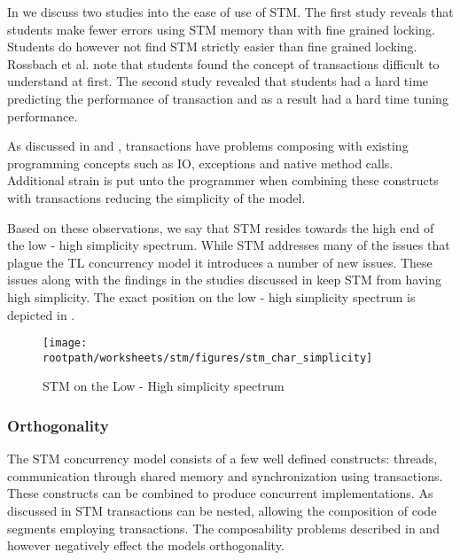 In  we discuss two studies into the ease of use of \ac{STM}. The first study reveals that students make fewer errors using \ac{STM} memory than with fine grained locking. Students do however not find \ac{STM} strictly easier than fine grained locking. Rossbach et al. note that students found the concept of transactions difficult to understand at first. The second study revealed that students had a hard time predicting the performance of transaction and as a result had a hard time tuning performance.

As discussed in  and , transactions have problems composing with existing programming concepts such as \ac{IO}, exceptions and native method calls. Additional strain is put unto the programmer when combining these constructs with transactions reducing the simplicity of the model.

Based on these observations, we say that \ac{STM} resides towards the high end of the low - high simplicity spectrum. While \ac{STM} addresses many of the issues that plague the \ac{TL} concurrency model it introduces a number of new issues. These issues along with the findings in the studies discussed in  keep \ac{STM} from having high simplicity. The exact position on the low - high simplicity spectrum is depicted in .

\begin{figure}[htbp]
\centering
 \texttt{[image: \\rootpath/worksheets/stm/figures/stm\_char\_simplicity]} 
 \caption{\ac{STM} on the Low - High simplicity spectrum}
\label{fig:stm_char_simplicity}
\end{figure}

\subsubsection{Orthogonality}\label{sec:stm_orthogonality}
\label{subsec:stm_orthogonality}
The \ac{STM} concurrency model consists of a few well defined constructs: threads, communication through shared memory and synchronization using transactions. These constructs can be combined to produce concurrent implementations. As discussed in  \ac{STM} transactions can be nested, allowing the composition of code segments employing transactions. The composability problems described in  and  however negatively effect the models orthogonality.

